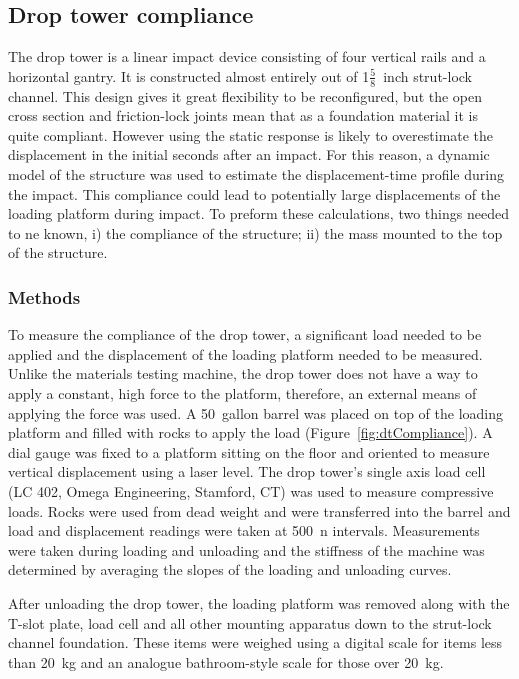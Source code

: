 \subsection{Drop tower compliance}
\label{sec:equipment_dt_compliance}
The drop tower is a linear impact device consisting of four vertical rails and a horizontal gantry.
It is constructed almost entirely out of 1$\frac{5}{8}$~inch strut-lock channel.
This design gives it great flexibility to be reconfigured, but the open cross section and friction-lock joints mean that as a foundation material it is quite compliant.
However using the static response is likely to overestimate the displacement in the initial seconds after an impact.
For this reason, a dynamic model of the structure was used to estimate the displacement-time profile during the impact.
This compliance could lead to potentially large displacements of the loading platform during impact.
To preform these calculations, two things needed to ne known, i) the compliance of the structure; ii) the mass mounted to the top of the structure.

\subsubsection{Methods}
To measure the compliance of the drop tower, a significant load needed to be applied and the displacement of the loading platform needed to be measured.
Unlike the materials testing machine, the drop tower does not have a way to apply a constant, high force to the platform, therefore, an external means of applying the force was used.
A 50~gallon barrel was placed on top of the loading platform and filled with rocks to apply the load (Figure~\ref{fig:dtCompliance}).
A dial gauge was fixed to a platform sitting on the floor and oriented to measure vertical displacement using a laser level.
The drop tower's single axis load cell (LC 402, Omega Engineering, Stamford, CT) was used to measure compressive loads.
Rocks were used from dead weight and were transferred into the barrel and load and displacement readings were taken at 500~\ac{n} intervals.
Measurements were taken during loading and unloading and the stiffness of the machine was determined by averaging the slopes of the loading and unloading curves.

After unloading the drop tower, the loading platform was removed along with the T-slot plate, load cell and all other mounting apparatus down to the strut-lock channel foundation.
These items were weighed using a digital scale for items less than 20~\ac{kg} and an analogue bathroom-style scale for those over 20~\ac{kg}.

